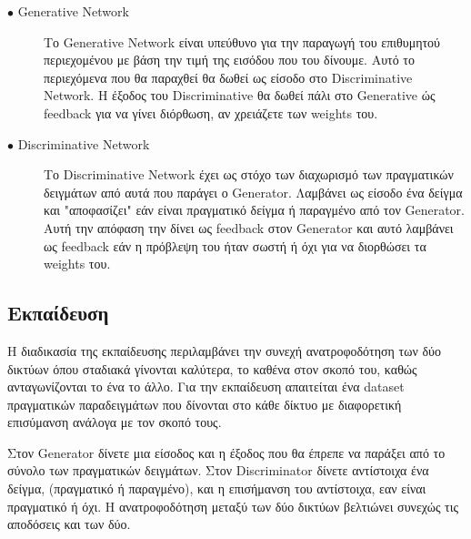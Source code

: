 \begin{description}

\item[$\bullet$ Generative Network] Το Generative Network είναι υπεύθυνο για την παραγωγή του επιθυμητού περιεχομένου με βάση την τιμή της εισόδου που του δίνουμε. Αυτό το περιεχόμενα που θα παραχθεί θα δωθεί ως είσοδο στο Discriminative Network. H έξοδος του Discriminative θα δωθεί πάλι στο Generative ώς feedback για να γίνει διόρθωση, αν χρειάζετε των weights του.

\item[$\bullet$ Discriminative Network] Το Discriminative Network έχει ως στόχο των διαχωρισμό των πραγματικών δειγμάτων από αυτά που παράγει ο Generator. Λαμβάνει ως είσοδο ένα δείγμα και "αποφασίζει" εάν είναι πραγματικό δείγμα ή παραγμένο από τον Generator. Αυτή την απόφαση την δίνει ως feedback στον Generator και αυτό λαμβάνει ως feedback εάν η πρόβλεψη του ήταν σωστή ή όχι για να διορθώσει τα weights του.

\end{description}

\subsection{Εκπαίδευση}
H διαδικασία της εκπαίδευσης περιλαμβάνει την συνεχή ανατροφοδότηση των δύο δικτύων όπου σταδιακά γίνονται καλύτερα, το καθένα στον σκοπό του, καθώς ανταγωνίζονται το ένα το άλλο. Για την εκπαίδευση απαιτείται ένα dataset πραγματικών παραδειγμάτων που δίνονται στο κάθε δίκτυο με διαφορετική επισύμανση ανάλογα με τον σκοπό τους.
\par
Στον Generator δίνετε μια είσοδος και η έξοδος που θα έπρεπε να παράξει από το σύνολο των πραγματικών δειγμάτων. Στον Discriminator δίνετε αντίστοιχα ένα δείγμα, (πραγματικό ή παραγμένο), και η επισήμανση του αντίστοιχα, εαν είναι πραγματικό ή όχι. Η ανατροφοδότηση μεταξύ των δύο δικτύων βελτιώνει συνεχώς τις αποδόσεις και των δύο.


